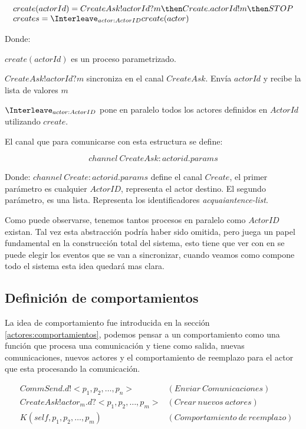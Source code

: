 \[
\begin{array}{l}
create(actorId) = CreateAsk!actorId?m \then Create.actorId!m \then STOP \\
creates = \Interleave_{actor : ActorID} create(actor)
\end{array}
\]

Donde:

\begin{description}
 \item $create(actorId)$ es un proceso parametrizado.
 \item $CreateAsk!actorId?m$ sincroniza en el canal $CreateAsk$. Envía $actorId$ y recibe la lista de valores $m$
 \item $\Interleave_{actor : ActorID}$ pone en paralelo todos los actores definidos en $ActorId$ utilizando $create$. 
\end{description}

El canal que para comunicarse con esta estructura se define:

\[
channel\ CreateAsk:actorid.params
\]

Donde: $channel\ Create:actorid.params$ define el canal $Create$, el primer parámetro es cualquier $ActorID$, representa el actor destino. El segundo parámetro, es una lista. Representa los identificadores \textit{acquaiantence-list}. 

Como puede observarse, tenemos tantos procesos en paralelo como $ActorID$ existan. Tal vez esta abstracción podría haber sido omitida, pero juega un papel fundamental en la construcción total del sistema, esto tiene que ver con en \CSP se puede elegir los eventos \cite[chap.~2,p.~55]{Roscoe:1997:TPC:550448} que se van a sincronizar, cuando veamos como compone todo el sistema esta idea quedará mas clara.

\subsection{Definición de comportamientos}
La idea de comportamiento fue introducida en la sección \ref{actores:comportamientos}, podemos pensar a un comportamiento como una función que procesa una comunicación y tiene como salida, nuevas comunicaciones, nuevos actores y el comportamiento de reemplazo para el actor que esta procesando la comunicación.

\begin{align*}
&CommSend.d!<p_1, p_2, \ldots, p_n> & (Enviar\ Comunicaciones) \\ 
&CreateAsk!actor_m.d?<p_1, p_2, \ldots, p_m> & (Crear\ nuevos\ actores)\\
&K(self, p_1, p_2, \ldots, p_m)  & (Comportamiento\ de\ reemplazo)
\end{align*}

